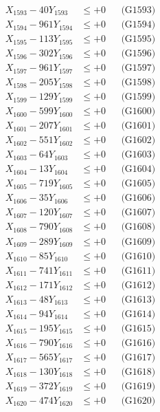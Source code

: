 \documentclass[a4paper,10pt]{article}
\begin{document}
{\begin{align}
X_{1593} - 40Y_{1593} &\leq +0 && \text{(G1593)} \\
X_{1594} - 961Y_{1594} &\leq +0 && \text{(G1594)} \\
X_{1595} - 113Y_{1595} &\leq +0 && \text{(G1595)} \\
X_{1596} - 302Y_{1596} &\leq +0 && \text{(G1596)} \\
X_{1597} - 961Y_{1597} &\leq +0 && \text{(G1597)} \\
X_{1598} - 205Y_{1598} &\leq +0 && \text{(G1598)} \\
X_{1599} - 129Y_{1599} &\leq +0 && \text{(G1599)} \\
X_{1600} - 599Y_{1600} &\leq +0 && \text{(G1600)} \\
\allowbreak
X_{1601} - 207Y_{1601} &\leq +0 && \text{(G1601)} \\
X_{1602} - 551Y_{1602} &\leq +0 && \text{(G1602)} \\
X_{1603} - 64Y_{1603} &\leq +0 && \text{(G1603)} \\
X_{1604} - 13Y_{1604} &\leq +0 && \text{(G1604)} \\
X_{1605} - 719Y_{1605} &\leq +0 && \text{(G1605)} \\
X_{1606} - 35Y_{1606} &\leq +0 && \text{(G1606)} \\
X_{1607} - 120Y_{1607} &\leq +0 && \text{(G1607)} \\
X_{1608} - 790Y_{1608} &\leq +0 && \text{(G1608)} \\
X_{1609} - 289Y_{1609} &\leq +0 && \text{(G1609)} \\
X_{1610} - 85Y_{1610} &\leq +0 && \text{(G1610)} \\
\allowbreak
X_{1611} - 741Y_{1611} &\leq +0 && \text{(G1611)} \\
X_{1612} - 171Y_{1612} &\leq +0 && \text{(G1612)} \\
X_{1613} - 48Y_{1613} &\leq +0 && \text{(G1613)} \\
X_{1614} - 94Y_{1614} &\leq +0 && \text{(G1614)} \\
X_{1615} - 195Y_{1615} &\leq +0 && \text{(G1615)} \\
X_{1616} - 790Y_{1616} &\leq +0 && \text{(G1616)} \\
X_{1617} - 565Y_{1617} &\leq +0 && \text{(G1617)} \\
X_{1618} - 130Y_{1618} &\leq +0 && \text{(G1618)} \\
X_{1619} - 372Y_{1619} &\leq +0 && \text{(G1619)} \\
X_{1620} - 474Y_{1620} &\leq +0 && \text{(G1620)} \\

\end{align}}
\end{document}
